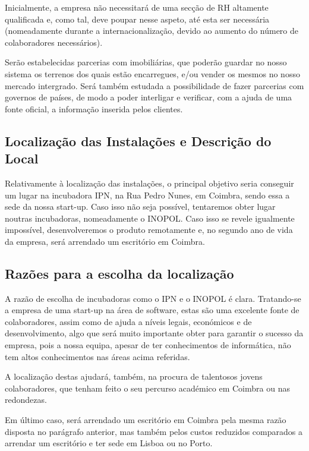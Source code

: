\documentclass[11pt]{article}
\begin{document}
	Inicialmente, a empresa não necessitará de uma secção de RH altamente qualificada e, como tal, deve poupar nesse aspeto, até esta ser necessária (nomeadamente durante a internacionalização, devido ao aumento do número de colaboradores necessários).
	
	Serão estabelecidas parcerias com imobiliárias, que poderão guardar no nosso sistema os terrenos dos quais estão encarregues, e/ou vender os mesmos no nosso mercado intergrado. Será também estudada a possibilidade de fazer parcerias com governos de países, de modo a poder interligar e verificar, com a ajuda de uma fonte oficial, a informação inserida pelos clientes.
	
	\large
	\subsection{Localização das Instalações e Descrição do Local}
	
	\normalsize
	
	Relativamente à localização das instalações, o principal objetivo seria conseguir um lugar na incubadora IPN, na Rua Pedro Nunes, em Coimbra, sendo essa a sede da nossa start-up. Caso isso não seja possível, tentaremos obter lugar noutras incubadoras, nomeadamente o INOPOL. Caso isso se revele igualmente impossível, desenvolveremos o produto remotamente e, no segundo ano de vida da empresa, será arrendado um escritório em Coimbra.
	
	\large
	\subsection{Razões para a escolha da localização}
	
	\normalsize
	
	A razão de escolha de incubadoras como o IPN e o INOPOL é clara. Tratando-se a empresa de uma start-up na área de software, estas são uma excelente fonte de colaboradores, assim como de ajuda a níveis legais, económicos e de desenvolvimento, algo que será muito importante obter para garantir o sucesso da empresa, pois a nossa equipa, apesar de ter conhecimentos de informática, não tem altos conhecimentos nas áreas acima referidas. 
	
	A localização destas ajudará, também, na procura de talentosos jovens colaboradores, que tenham feito o seu percurso académico em Coimbra ou nas redondezas.
	
	Em último caso, será arrendado um escritório em Coimbra pela mesma razão disposta no parágrafo anterior, mas também pelos custos reduzidos comparados a arrendar um escritório e ter sede em Lisboa ou no Porto.
	
\end{document}
